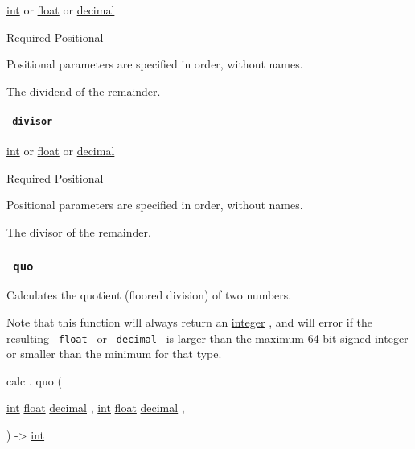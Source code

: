\href{/docs/reference/foundations/int/}{int} {or}
\href{/docs/reference/foundations/float/}{float} {or}
\href{/docs/reference/foundations/decimal/}{decimal}

{Required} {{ Positional }}

\label{functions-rem-euclid-dividend-positional-tooltip}
Positional parameters are specified in order, without names.

The dividend of the remainder.

\paragraph{\texorpdfstring{\texttt{\ divisor\ }}{ divisor }}\label{functions-rem-euclid-divisor}

\href{/docs/reference/foundations/int/}{int} {or}
\href{/docs/reference/foundations/float/}{float} {or}
\href{/docs/reference/foundations/decimal/}{decimal}

{Required} {{ Positional }}

\label{functions-rem-euclid-divisor-positional-tooltip}
Positional parameters are specified in order, without names.

The divisor of the remainder.

\subsubsection{\texorpdfstring{\texttt{\ quo\ }}{ quo }}\label{functions-quo}

Calculates the quotient (floored division) of two numbers.

Note that this function will always return an
\href{/docs/reference/foundations/int/}{integer} , and will error if the
resulting \href{/docs/reference/foundations/float/}{\texttt{\ float\ }}
or \href{/docs/reference/foundations/decimal/}{\texttt{\ decimal\ }} is
larger than the maximum 64-bit signed integer or smaller than the
minimum for that type.

calc { . } { quo } (

{ \href{/docs/reference/foundations/int/}{int}
\href{/docs/reference/foundations/float/}{float}
\href{/docs/reference/foundations/decimal/}{decimal} , } {
\href{/docs/reference/foundations/int/}{int}
\href{/docs/reference/foundations/float/}{float}
\href{/docs/reference/foundations/decimal/}{decimal} , }

) -\textgreater{} \href{/docs/reference/foundations/int/}{int}

